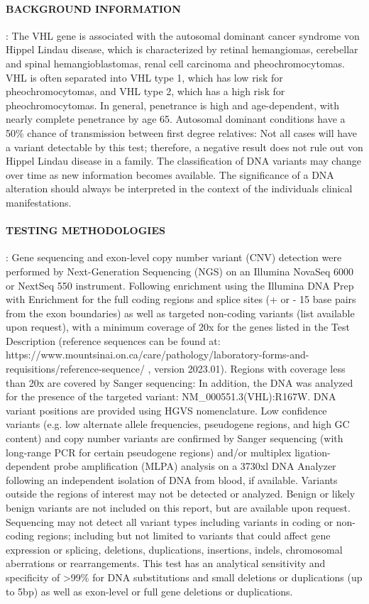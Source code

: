 \documentclass[10pt]{extarticle}
\begin{document}
\hdashrule[0.5ex]{\textwidth}{1pt}{1mm}

\paragraph{BACKGROUND INFORMATION}: The VHL gene is associated with the autosomal dominant cancer syndrome von Hippel Lindau disease, which is characterized by retinal hemangiomas, cerebellar and spinal hemangioblastomas, renal cell carcinoma and pheochromocytomas. VHL is often separated into VHL type 1, which has low risk for pheochromocytomas, and VHL type 2, which has a high risk for pheochromocytomas. In general, penetrance is high and age-dependent, with nearly complete penetrance by age 65. Autosomal dominant conditions have a 50\% chance of transmission between first degree relatives: Not all cases will have a variant detectable by this test; therefore, a negative result does not rule out von Hippel Lindau disease in a family. The classification of DNA variants may change over time as new information becomes available. The significance of a DNA alteration should always be interpreted in the context of the individuals clinical manifestations.

\paragraph{TESTING METHODOLOGIES}: Gene sequencing and exon-level copy number variant (CNV) detection were performed by Next-Generation Sequencing (NGS) on an Illumina NovaSeq 6000 or NextSeq 550 instrument. Following enrichment using the Illumina DNA Prep with Enrichment for the full coding regions and splice sites (+ or - 15 base pairs from the exon boundaries) as well as targeted non-coding variants (list available upon request), with a minimum coverage of 20x for the genes listed in the Test Description (reference sequences can be found at: https://www.mountsinai.on.ca/care/pathology/laboratory-forms-and-requisitions/reference-sequence/ , version 2023.01). Regions with coverage less than 20x are covered by Sanger sequencing: In addition, the DNA was analyzed for the presence of the targeted variant: NM\_000551.3(VHL):R167W. DNA variant positions are provided using HGVS nomenclature. Low confidence variants (e.g. low alternate allele frequencies, pseudogene regions, and high GC content) and copy number variants are confirmed by Sanger sequencing (with long-range PCR for certain pseudogene regions) and/or multiplex ligation-dependent probe amplification (MLPA) analysis on a 3730xl DNA Analyzer following an independent isolation of DNA from blood, if available. Variants outside the regions of interest may not be detected or analyzed. Benign or likely benign variants are not included on this report, but are available upon request. Sequencing may not detect all variant types including variants in coding or non-coding regions; including but not limited to variants that could affect gene expression or splicing, deletions, duplications, insertions, indels, chromosomal aberrations or rearrangements. This test has an analytical sensitivity and specificity of >99\% for DNA substitutions and small deletions or duplications (up to 5bp) as well as exon-level or full gene deletions or duplications.
\end{document}
